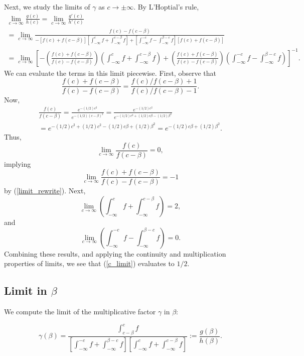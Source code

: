 \documentclass[12pt]{article}
\begin{document}
Next, we study the limits of $\gamma$ as $c \to \pm \infty$. By L'Hoptial's rule, \begin{multline}\label{c_limit} \lim_{c \to \infty} \frac{g(c)}{h(c)} = \lim_{c \to \infty} \frac{g'(c)}{h'(c)} \\ = \lim_{c \to \infty} \frac{ f(c) - f(c - \beta) }{ -[f(c) + f(c - \beta)] \left[\int_{-\infty}^c f + \int_{-\infty}^{c - \beta} f \right] + \left[\int_{-\infty}^{-c} f -\int_{-\infty}^{\beta - c} f \right]\left[ f(c) + f(c - \beta) \right] } \\ = \lim_{c \to \infty} \left[ - \left(\frac{f(c) + f(c - \beta) }{ f(c) -f(c - \beta)} \right) \left( \int_{-\infty}^c f + \int_{-\infty}^{c - \beta} f \right) + \left( \frac{ f(c) + f(c - \beta) }{ f(c) - f(c - \beta) } \right)  \left( \int_{-\infty}^{-c} f - \int_{-\infty}^{\beta - c} f \right)\right]^{-1}.
\end{multline}
We can evaluate the terms in this limit piecewise. First, observe that
\begin{equation}\label{limit_rewrite}
\frac{ f(c) + f(c - \beta) }{ f(c) - f(c - \beta)} = \frac{ f(c)/f(c - \beta) + 1 }{f(c)/f(c - \beta) - 1}.\end{equation} Now,
\begin{multline*}
\frac{ f(c) }{  f(c - \beta) } = \frac{e^{-(1/2) c^2}}{ e^{-(1/2)(c-\beta)^2} } = \frac{ e^{-(1/2)c^2} }{ e^{ -(1/2) c^2 + (1/2)c\beta - (1/2)\beta^2}} \\ = e^{-(1/2)c^2 + (1/2)c^2 -(1/2)c\beta + (1/2)\beta^2} = e^{-(1/2)c\beta + (1/2)\beta^2}.
\end{multline*}
Thus,
$$ \lim_{c \to \infty} \frac{f(c)}{f(c - \beta)} = 0,$$ implying
$$ \lim_{c \to \infty} \frac{ f(c) + f(c - \beta) }{ f(c) - f(c - \beta)} = -1 $$ by (\ref{limit_rewrite}). Next,
$$\lim_{c \to \infty} \left( \int_{-\infty}^c f + \int_{-\infty}^{c - \beta} f \right) = 2,$$ and $$\lim_{c \to \infty}  \left( \int_{-\infty}^{-c} f - \int_{-\infty}^{\beta - c} f \right) = 0.$$
Combining these results, and applying the continuity and multiplication properties of limits, we see that (\ref{c_limit}) evaluates to $1/2.$

\subsection{Limit in $\beta$}

We compute the limit of the multiplicative factor $\gamma$ in $\beta$:

$$\gamma(\beta) = \frac{\int_{c-\beta}^{c} f }{ \left[ \int_{-\infty}^{-c} f + \int_{-\infty}^{\beta - c} f \right] \left[ \int_{-\infty}^c f + \int_{-\infty}^{c - \beta} f \right]} := \frac{g(\beta)}{h(\beta)}.$$ 
\end{document}
